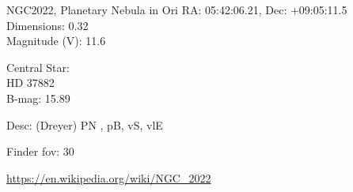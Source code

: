 \begin{block}{NGC2022, Planetary Nebula in Ori}
    RA: 05:42:06.21, Dec: +09:05:11.5 \\ 
    Dimensions: 0.32 \\ 
    Magnitude (V): 11.6

    Central Star: \\ 
      \hspace{1em}HD 37882 \\ 
      \hspace{1em}B-mag: 15.89 

    Desc: (Dreyer) PN , pB, vS, vlE 

    Finder fov: 30 

    \url{https://en.wikipedia.org/wiki/NGC_2022} 
\end{block}